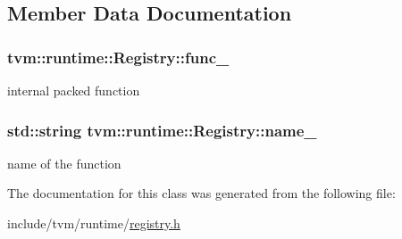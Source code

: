 \subsection{Member Data Documentation}
\subsubsection[{\texorpdfstring{func\+\_\+}{func_}}]{ tvm\+::runtime\+::\+Registry\+::func\+\_\+\hspace{0.3cm}{\ttfamily [protected]}}\hypertarget{classtvm_1_1runtime_1_1Registry_a911416a22858355e0b95ec493db67218}{}\label{classtvm_1_1runtime_1_1Registry_a911416a22858355e0b95ec493db67218}


internal packed function 

\subsubsection[{\texorpdfstring{name\+\_\+}{name_}}]{\setlength{\rightskip}{0pt plus 5cm}std\+::string tvm\+::runtime\+::\+Registry\+::name\+\_\+\hspace{0.3cm}{\ttfamily [protected]}}\hypertarget{classtvm_1_1runtime_1_1Registry_a4d8221b67729bafee4c2c5b424ed80ea}{}\label{classtvm_1_1runtime_1_1Registry_a4d8221b67729bafee4c2c5b424ed80ea}


name of the function 



The documentation for this class was generated from the following file\+:\begin{DoxyCompactItemize}
\item 
include/tvm/runtime/\hyperlink{registry_8h}{registry.\+h}\end{DoxyCompactItemize}
